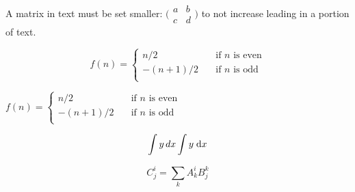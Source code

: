 \documentclass{article}
\begin{document}
A matrix in text must be set smaller:
$\bigl(\begin{smallmatrix}
a&b \\ c&d
\end{smallmatrix} \bigr)$
to not increase leading in a portion of text.

\[
f(n) =
    \begin{cases}
        n/2       & \quad \text{if } n \text{ is even}\\
        -(n+1)/2  & \quad \text{if } n \text{ is odd}\\
    \end{cases}
\]

\(
f(n) =
    \begin{cases}
        n/2       & \quad \text{if } n \text{ is even}\\
        -(n+1)/2  & \quad \text{if } n \text{ is odd}\\
    \end{cases}
\)

\[
\int y\, dx \\
\int y\; \mathrm{d} x
\]

\newcommand{\dd}{\mathop{} \,\mathrm{d}}

\begin{equation}
    C^i_j = {\textstyle \sum_k} A^i_k B^k_j
\end{equation}
\end{document}
